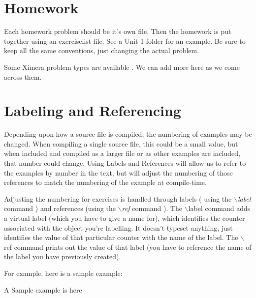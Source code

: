 \documentclass[nooutcomes]{ximera}
\begin{document}
\newpage


\section{Homework}
Each homework problem should be it's own file.  Then the homework is put together using an exerciselist file.  See a Unit 1 folder for an example.  Be sure to keep all the same conventions, just changing the actual problem.  

Some Ximera problem types are available .  We can add more here as we come across them.


\section{Labeling and Referencing}

Depending upon how a source file is compiled, the numbering of examples may be changed. When compiling a single source file, this could be a small value,
but when included and compiled as a larger file or as other examples are included, that number could change. Using Labels and References will allow us to 
refer to the examples by number in the text, but will adjust the numbering of those references to match the numbering of the example at compile-time.


Adjusting the numbering for exercises is handled through labels ( using the $\backslash$\emph{label} command ) and references (using the $\backslash$\emph{ref} command ). 
The $\backslash$label command adds a virtual label (which you have to give a name for), which identifies the counter associated with the object you're labelling. It doesn't typeset anything, just identifies the value of that particular counter with the name of the label. 
The $\backslash$ref command prints out the value of that label (you have to reference the name of the label you have previously created).

For example, here is a sample example:
\begin{example}\label{example:SampleExample}
	A Sample example is here
\end{example}
\end{document}
